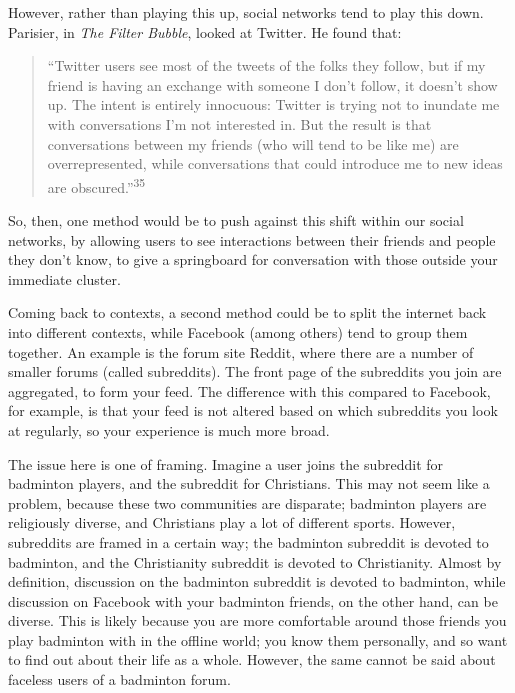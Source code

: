 \documentclass[]{article}
\begin{document}
However, rather than playing this up, social networks tend to play this
down. Parisier, in \emph{The Filter Bubble}, looked at Twitter. He found
that:

\begin{quote}
``Twitter users see most of the tweets of the folks they follow, but if
my friend is having an exchange with someone I don't follow, it doesn't
show up. The intent is entirely innocuous: Twitter is trying not to
inundate me with conversations I'm not interested in. But the result is
that conversations between my friends (who will tend to be like me) are
overrepresented, while conversations that could introduce me to new
ideas are obscured.''\textsuperscript{35}
\end{quote}

So, then, one method would be to push against this shift within our
social networks, by allowing users to see interactions between their
friends and people they don't know, to give a springboard for
conversation with those outside your immediate cluster.

Coming back to contexts, a second method could be to split the internet
back into different contexts, while Facebook (among others) tend to
group them together. An example is the forum site Reddit, where there
are a number of smaller forums (called subreddits). The front page of
the subreddits you join are aggregated, to form your feed. The
difference with this compared to Facebook, for example, is that your
feed is not altered based on which subreddits you look at regularly, so
your experience is much more broad.

The issue here is one of framing. Imagine a user joins the subreddit for
badminton players, and the subreddit for Christians. This may not seem
like a problem, because these two communities are disparate; badminton
players are religiously diverse, and Christians play a lot of different
sports. However, subreddits are framed in a certain way; the badminton
subreddit is devoted to badminton, and the Christianity subreddit is
devoted to Christianity. Almost by definition, discussion on the
badminton subreddit is devoted to badminton, while discussion on
Facebook with your badminton friends, on the other hand, can be diverse.
This is likely because you are more comfortable around those friends you
play badminton with in the offline world; you know them personally, and
so want to find out about their life as a whole. However, the same
cannot be said about faceless users of a badminton forum.
\end{document}
